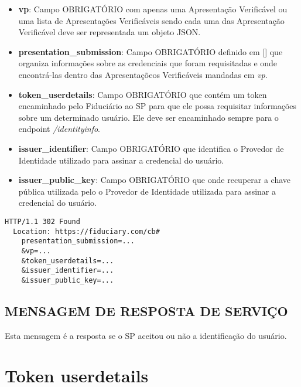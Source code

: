 \begin{itemize}
    \item \textbf{vp}: Campo OBRIGATÓRIO com apenas uma Apresentação Verificável ou uma lista de Apresentações Verificáveis sendo cada uma das Apresentação Verificável deve ser representada um objeto JSON. 
    
    \item \textbf{presentation\_submission}: Campo OBRIGATÓRIO definido em [] que organiza informações sobre as credenciais que foram requisitadas e onde encontrá-las dentro das Apresentaçõeos Verificáveis mandadas em \textit{vp}.

    \item \textbf{token\_userdetails}: Campo OBRIGATÓRIO que contém um token encaminhado pelo Fiduciário ao \acs{SP} para que ele possa requisitar informações sobre um determinado usuário. Ele deve ser encaminhado sempre para o endpoint \textit{/identityinfo}.

    \item \textbf{issuer\_identifier}: Campo OBRIGATÓRIO que identifica o Provedor de Identidade utilizado para assinar a credencial do usuário. 
    
    
    \item \textbf{issuer\_public\_key}: Campo OBRIGATÓRIO que onde recuperar a chave pública utilizada pelo o Provedor de Identidade utilizada para assinar a credencial do usuário. 

\end{itemize}

\begin{lstlisting}[language=code, caption=Exemplo para a mensagem id-response, label=input-label]
  HTTP/1.1 302 Found
  Location: https://fiduciary.com/cb#
    presentation_submission=...
    &vp=...
    &token_userdetails=...
    &issuer_identifier=...
    &issuer_public_key=...
\end{lstlisting}

\subsection{MENSAGEM DE RESPOSTA DE SERVIÇO}

Esta mensagem é a resposta se o \acs{SP} aceitou ou não a identificação do usuário.

\section{Token userdetails}

